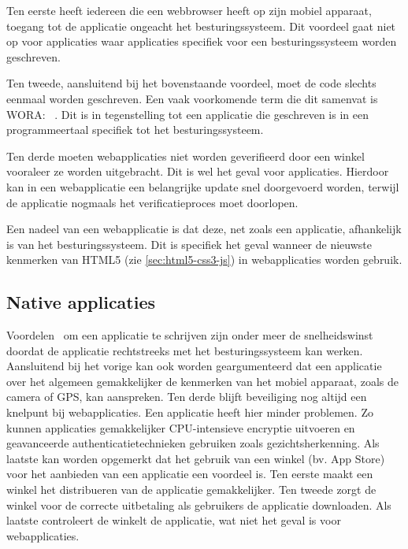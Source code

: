 Ten eerste heeft iedereen die een webbrowser heeft op zijn mobiel apparaat, toegang tot de applicatie ongeacht het besturingssysteem.
Dit voordeel gaat niet op voor  applicaties waar applicaties specifiek voor een besturingssysteem worden geschreven.

Ten tweede, aansluitend bij het bovenstaande voordeel, moet de code slechts eenmaal worden geschreven. 
Een vaak voorkomende term die dit samenvat is WORA: ~\cite{Hales2012}. 
Dit is in tegenstelling tot een  applicatie die geschreven is in een programmeertaal specifiek tot het besturingssysteem. 

Ten derde moeten webapplicaties niet worden geverifieerd door een winkel vooraleer ze worden uitgebracht. 
Dit is wel het geval voor  applicaties. 
Hierdoor kan in een webapplicatie een belangrijke update snel doorgevoerd worden, terwijl de  applicatie nogmaals het verificatieproces moet doorlopen.

Een nadeel van een webapplicatie is dat deze, net zoals een  applicatie, afhankelijk is van het besturingssysteem.
Dit is specifiek het geval wanneer de nieuwste kenmerken van HTML5 (zie \ref{sec:html5-css3-js}) in webapplicaties worden gebruik.

\subsection{Native applicaties}
\label{sec:literatuur-native}
Voordelen~\cite{Accenture2012} om een  applicatie te schrijven zijn onder meer de snelheidswinst doordat de applicatie rechtstreeks met het besturingssysteem kan werken. 
Aansluitend bij het vorige kan ook worden geargumenteerd dat een  applicatie over het algemeen gemakkelijker de kenmerken van het mobiel apparaat, zoals de camera of GPS, kan aanspreken. 
Ten derde blijft beveiliging nog altijd een knelpunt bij webapplicaties. Een  applicatie heeft hier minder problemen. 
Zo kunnen  applicaties gemakkelijker CPU-intensieve encryptie uitvoeren en geavanceerde authenticatietechnieken gebruiken zoals gezichtsherkenning.
Als laatste kan worden opgemerkt dat het gebruik van een winkel (bv. App Store) voor het aanbieden van een applicatie een voordeel is.
Ten eerste maakt een winkel het distribueren van de applicatie gemakkelijker.
Ten tweede zorgt de winkel voor de correcte uitbetaling als gebruikers de applicatie downloaden.
Als laatste controleert de winkelt de applicatie, wat niet het geval is voor webapplicaties.

